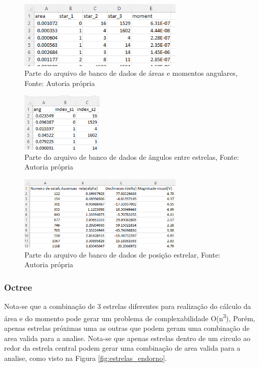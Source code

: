 \begin{figure}[H]
    \centering
    \includegraphics[width=0.7\textwidth]{images/banco_dados_area_moment.png}
    \caption{Parte do arquivo de banco de dados de áreas e momentos angulares, Fonte: Autoria própria}
    \label{fig:banco_dados_area_moment_to_cubesat}
\end{figure}

\begin{figure}[H]
    \centering
    \includegraphics[width=0.35\textwidth]{images/banco_dados_angulo.png}
    \caption{Parte do arquivo de banco de dados de ângulos entre estrelas, Fonte: Autoria própria}
    \label{fig:banco_dados_angulo}
\end{figure}

\begin{figure}[H]
    \centering
    \includegraphics[width=0.7\textwidth]{images/banco_dados_posicao.png}
    \caption{Parte do arquivo de banco de dados de posição estrelar, Fonte: Autoria própria}
    \label{fig:banco_dados_posicao}
\end{figure}

\subsubsection{Octree}

Nota-se que a combinação de 3 estrelas diferentes para realização do cálculo da área e do momento pode gerar um problema de complexabilidade O(n\textsuperscript{3}),
Porém, apenas estrelas próximas uma as outras que podem geram uma combinação de area valida para a analise.
Nota-se que apenas estrelas dentro de um circulo ao redor da estrela central podem gerar uma combinação de area valida para a analise, como visto na Figura \ref{fig:estrelas_endorno}.

